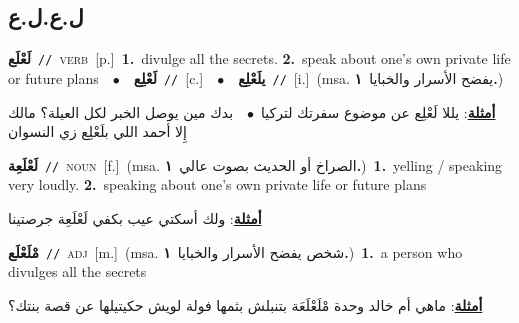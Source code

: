 \documentclass[10pt,a4paper,twoside]{article} %
\begin{document}
\begin{multicols}{2}
\vspace{-3mm}
\subsection*{\color{blue}\foreignlanguage{arabic}{ل.ع.ل.ع}\color{blue}{}} 

{\setlength\topsep{0pt}\textbf{\foreignlanguage{arabic}{لَعْلَع}}\ {\color{gray}\texttt{//}\color{black}}\ \textsc{verb}\ [p.]\ \textbf{1.}~divulge all the secrets.  \textbf{2.}~speak about one's own private life or future plans\ \ $\bullet$\ \ \setlength\topsep{0pt}\textbf{\foreignlanguage{arabic}{لَعْلِع}}\ {\color{gray}\texttt{//}\color{black}}\ [c.]\ \ $\bullet$\ \ \setlength\topsep{0pt}\textbf{\foreignlanguage{arabic}{يلَعْلِع}}\ {\color{gray}\texttt{//}\color{black}}\ [i.]\ \color{gray}(msa. \foreignlanguage{arabic}{يفضح الأسرار والخبايا}~\foreignlanguage{arabic}{\textbf{١.}})\color{black}\  \begin{flushright}\color{gray}\foreignlanguage{arabic}{\textbf{\underline{\foreignlanguage{arabic}{أمثلة}}}: يللا لَعْلِع عن موضوع سفرتك لتركيا\ $\bullet$\ \  بدك مين يوصل الخبر لكل العيلة؟ مالك إِلا أحمد اللي بلَعْلِع زي النسوان}\end{flushright}\color{black}} \vspace{2mm}

{\setlength\topsep{0pt}\textbf{\foreignlanguage{arabic}{لَعْلَعِة}}\ {\color{gray}\texttt{//}\color{black}}\ \textsc{noun}\ [f.]\ \color{gray}(msa. \foreignlanguage{arabic}{الصراخ أو الحديث بصوت عالي}~\foreignlanguage{arabic}{\textbf{١.}})\color{black}\ \textbf{1.}~yelling / speaking very loudly.  \textbf{2.}~speaking about one's own private life or future plans\  \begin{flushright}\color{gray}\foreignlanguage{arabic}{\textbf{\underline{\foreignlanguage{arabic}{أمثلة}}}: ولك أسكتي عيب بكفي لَعْلَعِة جرصتينا}\end{flushright}\color{black}} \vspace{2mm}

{\setlength\topsep{0pt}\textbf{\foreignlanguage{arabic}{مْلَعْلَع}}\ {\color{gray}\texttt{//}\color{black}}\ \textsc{adj}\ [m.]\ \color{gray}(msa. \foreignlanguage{arabic}{شخص يفضح الأسرار والخبايا}~\foreignlanguage{arabic}{\textbf{١.}})\color{black}\ \textbf{1.}~a person who divulges all the secrets\  \begin{flushright}\color{gray}\foreignlanguage{arabic}{\textbf{\underline{\foreignlanguage{arabic}{أمثلة}}}: ماهي أم خالد وحدة مْلَعْلَعَة بتنبلش بثمها فولة لويش حكيتيلها عن قصة بنتك؟}\end{flushright}\color{black}} \vspace{2mm}


\end{multicols}
\end{document}
